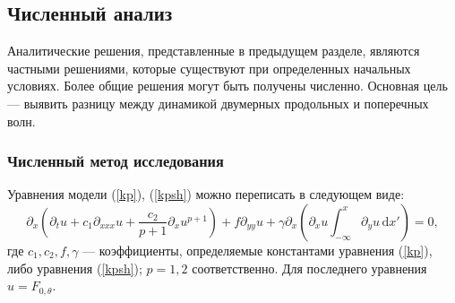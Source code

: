 \subsection{Численный анализ}
Аналитические решения, представленные в предыдущем разделе, являются частными решениями, которые существуют при определенных начальных условиях. Более общие решения могут быть получены численно. Основная цель --- выявить разницу между динамикой двумерных продольных и поперечных волн.

\subsubsection{Численный метод исследования}
Уравнения модели (\ref {kp}), (\ref {kpsh}) можно переписать в следующем виде:
\begin{equation}
	\label{kp3gen}
	\partial_x\left(\partial_t u+c_1 \partial_{xxx} u+\frac{c_2 }{p+1}\partial_x u^{p+1}\right)+f \partial_{yy} u+\gamma \partial_x\left(\partial_x u \int_{-\infty}^x \partial_y u \, \mathrm{d} x'\right)=0,
\end{equation}
где $ c_1, c_2, f, \gamma $ --- коэффициенты, определяемые константами уравнения (\ref{kp}), либо уравнения (\ref{kpsh}); $ p = 1,2 $ соответственно. Для последнего уравнения $u = F_{0, \theta} $.

